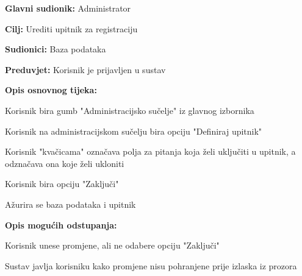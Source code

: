 					\noindent {}
					\begin{packed_item}
						\item \textbf{Glavni sudionik:} Administrator
						\item \textbf{Cilj:} Urediti upitnik za registraciju
						\item \textbf{Sudionici:} Baza podataka
						\item \textbf{Preduvjet:} Korisnik je prijavljen u sustav
						
						\item \textbf{Opis osnovnog tijeka:} 
						\item[] \begin{packed_enum}
							\item Korisnik bira gumb "Administracijsko sučelje" iz glavnog izbornika
							\item Korisnik na administracijskom sučelju bira opciju "Definiraj upitnik"
							\item Korisnik "kvačicama" označava polja za pitanja koja želi uključiti u upitnik, a odznačava ona koje želi ukloniti
							\item Korisnik bira opciju "Zaključi"
							\item Ažurira se baza podataka i upitnik
						\end{packed_enum}
					
						\item \textbf{Opis mogućih odstupanja:}
						\item[] \begin{packed_enum}

							\item[2.a] Korisnik unese promjene, ali ne odabere opciju "Zaključi"
							\item[] \begin{packed_enum}
								\item[1.] Sustav javlja korisniku kako promjene nisu pohranjene prije izlaska iz prozora
							\end{packed_enum}
							
						\end{packed_enum}
					\end{packed_item}



